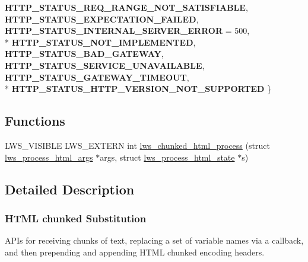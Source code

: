 \begin{DoxyCompactItemize}
{\bfseries H\+T\+T\+P\+\_\+\+S\+T\+A\+T\+U\+S\+\_\+\+R\+E\+Q\+\_\+\+R\+A\+N\+G\+E\+\_\+\+N\+O\+T\+\_\+\+S\+A\+T\+I\+S\+F\+I\+A\+B\+LE}, 
{\bfseries H\+T\+T\+P\+\_\+\+S\+T\+A\+T\+U\+S\+\_\+\+E\+X\+P\+E\+C\+T\+A\+T\+I\+O\+N\+\_\+\+F\+A\+I\+L\+ED}, 
{\bfseries H\+T\+T\+P\+\_\+\+S\+T\+A\+T\+U\+S\+\_\+\+I\+N\+T\+E\+R\+N\+A\+L\+\_\+\+S\+E\+R\+V\+E\+R\+\_\+\+E\+R\+R\+OR} = 500, 
\\*
{\bfseries H\+T\+T\+P\+\_\+\+S\+T\+A\+T\+U\+S\+\_\+\+N\+O\+T\+\_\+\+I\+M\+P\+L\+E\+M\+E\+N\+T\+ED}, 
{\bfseries H\+T\+T\+P\+\_\+\+S\+T\+A\+T\+U\+S\+\_\+\+B\+A\+D\+\_\+\+G\+A\+T\+E\+W\+AY}, 
{\bfseries H\+T\+T\+P\+\_\+\+S\+T\+A\+T\+U\+S\+\_\+\+S\+E\+R\+V\+I\+C\+E\+\_\+\+U\+N\+A\+V\+A\+I\+L\+A\+B\+LE}, 
{\bfseries H\+T\+T\+P\+\_\+\+S\+T\+A\+T\+U\+S\+\_\+\+G\+A\+T\+E\+W\+A\+Y\+\_\+\+T\+I\+M\+E\+O\+UT}, 
\\*
{\bfseries H\+T\+T\+P\+\_\+\+S\+T\+A\+T\+U\+S\+\_\+\+H\+T\+T\+P\+\_\+\+V\+E\+R\+S\+I\+O\+N\+\_\+\+N\+O\+T\+\_\+\+S\+U\+P\+P\+O\+R\+T\+ED}
 \}\hypertarget{group__html-chunked-substitution_gabc3b93f68c8bdd857ad32913628dfa8d}{}\label{group__html-chunked-substitution_gabc3b93f68c8bdd857ad32913628dfa8d}

\end{DoxyCompactItemize}
\subsection*{Functions}
\begin{DoxyCompactItemize}
\item 
L\+W\+S\+\_\+\+V\+I\+S\+I\+B\+LE L\+W\+S\+\_\+\+E\+X\+T\+E\+RN int \hyperlink{group__html-chunked-substitution_ga643073f918c0a7016b690aae9793fd60}{lws\+\_\+chunked\+\_\+html\+\_\+process} (struct \hyperlink{structlws__process__html__args}{lws\+\_\+process\+\_\+html\+\_\+args} $\ast$args, struct \hyperlink{structlws__process__html__state}{lws\+\_\+process\+\_\+html\+\_\+state} $\ast$s)
\end{DoxyCompactItemize}


\subsection{Detailed Description}
\subsubsection*{H\+T\+ML chunked Substitution}

A\+P\+Is for receiving chunks of text, replacing a set of variable names via a callback, and then prepending and appending H\+T\+ML chunked encoding headers. 

